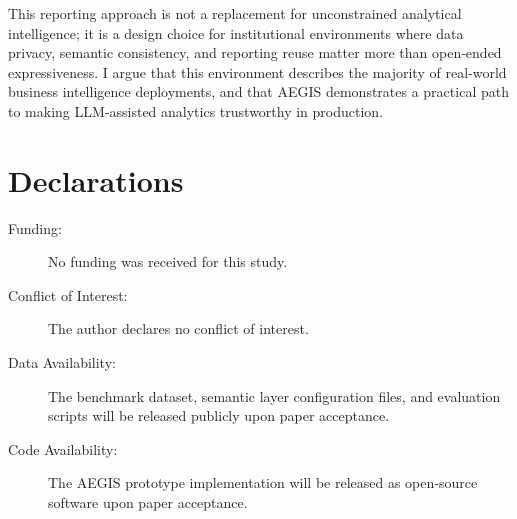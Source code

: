 \documentclass[11pt]{article}
\begin{document}
This reporting approach is not a replacement for unconstrained analytical intelligence; it is a design choice for institutional environments where data privacy, semantic consistency, and reporting reuse matter more than open‑ended expressiveness. I argue that this environment describes the majority of real‑world business intelligence deployments, and that AEGIS demonstrates a practical path to making LLM‑assisted analytics trustworthy in production.

\section*{Declarations}
\begin{description}
\item[Funding:] No funding was received for this study.
\item[Conflict of Interest:] The author declares no conflict of interest.
\item[Data Availability:] The benchmark dataset, semantic layer configuration files, and evaluation scripts will be released publicly upon paper acceptance.
\item[Code Availability:] The AEGIS prototype implementation will be released as open‑source software upon paper acceptance.
\end{description}
\end{document}
